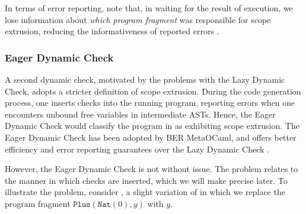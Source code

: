In terms of error reporting, note that, in waiting for the result of execution, we lose information about \textit{which program fragment} was responsible for scope extrusion, reducing the informativeness of reported errors \citep{kiselyov-14}.  

\subsubsection{Eager Dynamic Check}
A second dynamic check, motivated by the problems with the Lazy Dynamic Check, adopts a stricter definition of scope extrusion. During the code generation process, one inserts checks into the running program, reporting errors when one encounters  unbound free variables in intermediate ASTs. Hence, the Eager Dynamic Check would classify the program in  as exhibiting scope extrusion. The Eager Dynamic Check has been adopted by BER MetaOCaml, and offers better efficiency and error reporting guarantees over the Lazy Dynamic Check \citep{kiselyov-14}.

However, the Eager Dynamic Check is not without issue. The problem relates to the 
manner in which checks are inserted, which we will make precise later. To illustrate the problem, consider , a slight variation of  in which we replace the program fragment $\texttt{Plus}({\texttt{Nat}({0})}, y)$ with $y$. 

